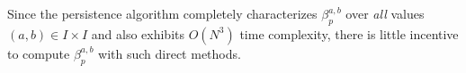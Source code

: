 \documentclass[10pt]{article}
\numberwithin{equation}{section}
\newcommand{\+}{%
	\raisebox{0.18ex}{\scaleobj{0.55}{+}}
}
\theoremstyle{definition}
\theoremstyle{definition}
\begin{document}
Since the persistence algorithm completely characterizes $\beta_p^{a,b}$ over \emph{all} values $(a,b) \in I \times I$ and also exhibits $O(N^3)$ time complexity, there is little incentive to compute $\beta_p^{a,b}$ with such direct methods.


\end{document}
